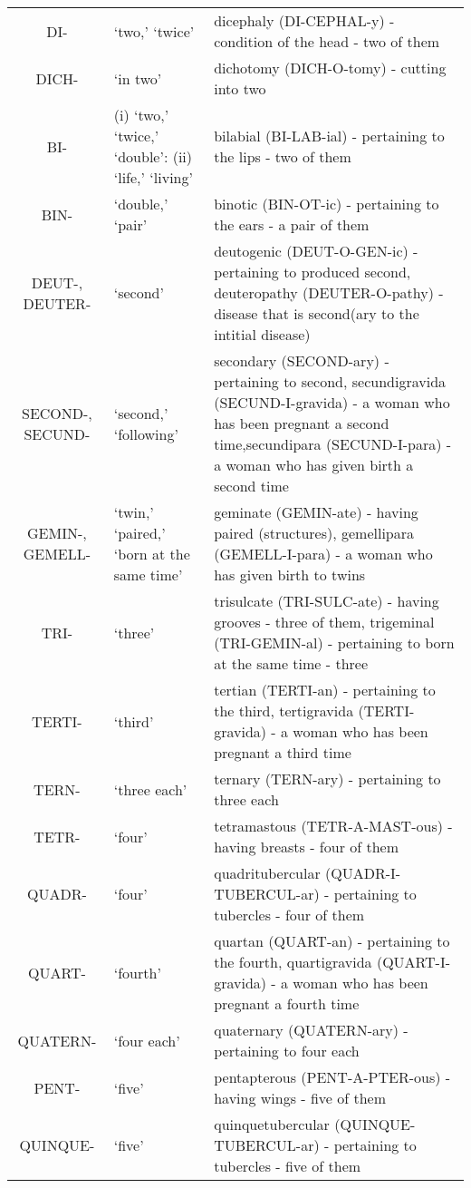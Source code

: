 \begin{longtable}{c | p{} | p{}}
        DI- & `two,' `twice' & dicephaly (DI-CEPHAL-y) - condition of the head - two of them \\
        DICH- & `in two' & dichotomy (DICH-O-tomy) - cutting into two \\
        BI- & (i) `two,' `twice,' `double': (ii) `life,' `living' & bilabial (BI-LAB-ial) - pertaining to the lips - two of them \\
        BIN- & `double,' `pair' & binotic (BIN-OT-ic) - pertaining to the ears - a pair of them \\
        DEUT-, DEUTER- & `second' & deutogenic (DEUT-O-GEN-ic) - pertaining to produced second, deuteropathy (DEUTER-O-pathy) - disease that is second(ary to the intitial disease) \\
        SECOND-, SECUND- & `second,' `following' & secondary (SECOND-ary) - pertaining to second, secundigravida (SECUND-I-gravida) - a woman who has been pregnant a second time,secundipara (SECUND-I-para) - a woman who has given birth a second time \\
        GEMIN-, GEMELL- & `twin,' `paired,' `born at the same time' & geminate (GEMIN-ate) - having paired (structures), gemellipara (GEMELL-I-para) - a woman who has given birth to twins \\
        TRI- & `three' & trisulcate (TRI-SULC-ate) - having grooves - three of them, trigeminal (TRI-GEMIN-al) - pertaining to born at the same time - three \\
        TERTI- & `third' & tertian (TERTI-an) - pertaining to the third, tertigravida (TERTI-gravida) - a woman who has been pregnant a third time \\
        TERN- & `three each' & ternary (TERN-ary) - pertaining to three each \\
        TETR- & `four' & tetramastous (TETR-A-MAST-ous) - having breasts - four of them \\
        QUADR- & `four' & quadritubercular (QUADR-I-TUBERCUL-ar) - pertaining to tubercles - four of them \\
        QUART- & `fourth' & quartan (QUART-an) - pertaining to the fourth, quartigravida (QUART-I-gravida) - a woman who has been pregnant a fourth time \\
        QUATERN- & `four each' & quaternary (QUATERN-ary) - pertaining to four each \\
        PENT- & `five' & pentapterous (PENT-A-PTER-ous) - having wings - five of them \\
        QUINQUE- & `five' & quinquetubercular (QUINQUE-TUBERCUL-ar) - pertaining to tubercles - five of them \\

\end{longtable}
